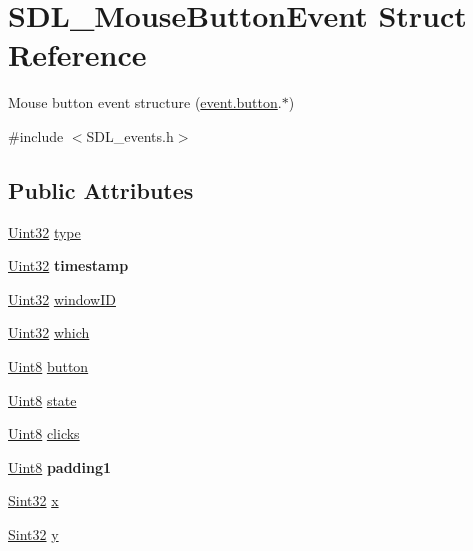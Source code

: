 \hypertarget{structSDL__MouseButtonEvent}{}\section{S\+D\+L\+\_\+\+Mouse\+Button\+Event Struct Reference}
\label{structSDL__MouseButtonEvent}


Mouse button event structure (\hyperlink{unionSDL__Event_ab6da2fa2687e5f849f270adecc64785f}{event.\+button}.$\ast$)  




{\ttfamily \#include $<$S\+D\+L\+\_\+events.\+h$>$}

\subsection*{Public Attributes}
\begin{DoxyCompactItemize}
\item 
\hyperlink{SDL__stdinc_8h_add440eff171ea5f55cb00c4a9ab8672d}{Uint32} \hyperlink{structSDL__MouseButtonEvent_af64cb09ea68b8081ecc8ee498552e3d7}{type}
\item 
\hypertarget{structSDL__MouseButtonEvent_ab05e8a454692608ff56c502e95799c56}{}\hyperlink{SDL__stdinc_8h_add440eff171ea5f55cb00c4a9ab8672d}{Uint32} {\bfseries timestamp}\label{structSDL__MouseButtonEvent_ab05e8a454692608ff56c502e95799c56}

\item 
\hyperlink{SDL__stdinc_8h_add440eff171ea5f55cb00c4a9ab8672d}{Uint32} \hyperlink{structSDL__MouseButtonEvent_ab3b855d4b543b5d02fcf5d56e4421393}{window\+I\+D}
\item 
\hyperlink{SDL__stdinc_8h_add440eff171ea5f55cb00c4a9ab8672d}{Uint32} \hyperlink{structSDL__MouseButtonEvent_a366aef59a0f393afc8a3561e741825df}{which}
\item 
\hyperlink{SDL__stdinc_8h_a2944638813a090aa23e62f4da842c3e2}{Uint8} \hyperlink{structSDL__MouseButtonEvent_a1a4680e19ae06d02d2093f0bcba1b24c}{button}
\item 
\hyperlink{SDL__stdinc_8h_a2944638813a090aa23e62f4da842c3e2}{Uint8} \hyperlink{structSDL__MouseButtonEvent_a8809cef85cfffad4f2059f2ba4fc6a3d}{state}
\item 
\hyperlink{SDL__stdinc_8h_a2944638813a090aa23e62f4da842c3e2}{Uint8} \hyperlink{structSDL__MouseButtonEvent_aa606bebcbc3ffc7e932016039c2a36a1}{clicks}
\item 
\hypertarget{structSDL__MouseButtonEvent_a765957d218d16fa00558fa4d20e80689}{}\hyperlink{SDL__stdinc_8h_a2944638813a090aa23e62f4da842c3e2}{Uint8} {\bfseries padding1}\label{structSDL__MouseButtonEvent_a765957d218d16fa00558fa4d20e80689}

\item 
\hyperlink{SDL__stdinc_8h_a7a90b941db9d4582e9ad7abb9940ff7e}{Sint32} \hyperlink{structSDL__MouseButtonEvent_a5bb9c61b86e999f58637511e32e3a076}{x}
\item 
\hyperlink{SDL__stdinc_8h_a7a90b941db9d4582e9ad7abb9940ff7e}{Sint32} \hyperlink{structSDL__MouseButtonEvent_a7ccb5c55a7ddadce723f4ea6d5269540}{y}
\end{DoxyCompactItemize}


